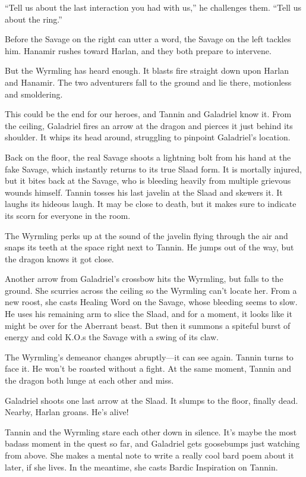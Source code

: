 \documentclass[smalldemyvopaper,11pt,twoside,onecolumn,openright,extrafontsizes]{memoir}
\begin{document}
``Tell us about the last interaction you had with us,'' he challenges
them. ``Tell us about the ring.''

Before the Savage on the right can utter a word, the Savage on the left
tackles him. Hanamir rushes toward Harlan, and they both prepare to
intervene.

But the Wyrmling has heard enough. It blasts fire straight down upon
Harlan and Hanamir. The two adventurers fall to the ground and lie
there, motionless and smoldering.

This could be the end for our heroes, and Tannin and Galadriel know it.
From the ceiling, Galadriel fires an arrow at the dragon and pierces it
just behind its shoulder. It whips its head around, struggling to
pinpoint Galadriel's location.

Back on the floor, the real Savage shoots a lightning bolt from his hand
at the fake Savage, which instantly returns to its true Slaad form. It
is mortally injured, but it bites back at the Savage, who is bleeding
heavily from multiple grievous wounds himself. Tannin tosses his last
javelin at the Slaad and skewers it. It laughs its hideous laugh. It may
be close to death, but it makes sure to indicate its scorn for everyone
in the room.

The Wyrmling perks up at the sound of the javelin flying through the air
and snaps its teeth at the space right next to Tannin. He jumps out of
the way, but the dragon knows it got close.

Another arrow from Galadriel's crossbow hits the Wyrmling, but falls to
the ground. She scurries across the ceiling so the Wyrmling can't locate
her. From a new roost, she casts Healing Word on the Savage, whose
bleeding seems to slow. He uses his remaining arm to slice the Slaad,
and for a moment, it looks like it might be over for the Aberrant beast.
But then it summons a spiteful burst of energy and cold K.O.s the Savage
with a swing of its claw.

The Wyrmling's demeanor changes abruptly---it can see again. Tannin
turns to face it. He won't be roasted without a fight. At the same
moment, Tannin and the dragon both lunge at each other and miss.

Galadriel shoots one last arrow at the Slaad. It slumps to the floor,
finally dead. Nearby, Harlan groans. He's alive!

Tannin and the Wyrmling stare each other down in silence. It's maybe the
most badass moment in the quest so far, and Galadriel gets goosebumps
just watching from above. She makes a mental note to write a really cool
bard poem about it later, if she lives. In the meantime, she casts
Bardic Inspiration on Tannin.
\end{document}
